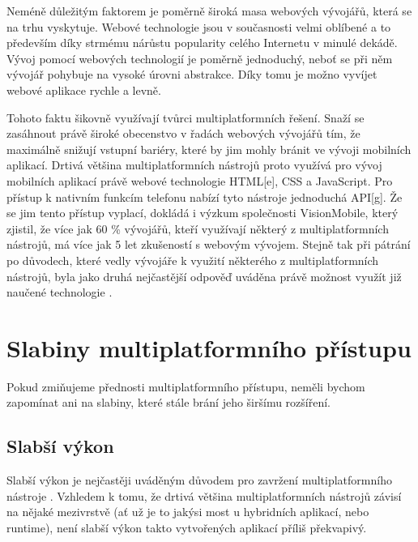 Neméně důležitým faktorem je poměrně široká masa webových vývojářů, která se na trhu vyskytuje. Webové technologie jsou v současnosti velmi oblíbené a to především díky strmému nárůstu popularity celého Internetu v minulé dekádě. Vývoj pomocí webových technologií je poměrně jednoduchý, neboť se při něm vývojář pohybuje na vysoké úrovni abstrakce. Díky tomu je možno vyvíjet webové aplikace rychle a levně.

Tohoto faktu šikovně využívají tvůrci multiplatformních řešení. Snaží se zasáhnout právě široké obecenstvo v řadách webových vývojářů tím, že maximálně snižují vstupní bariéry, které by jim mohly bránit ve vývoji mobilních aplikací. Drtivá většina multiplatformních nástrojů proto využívá pro vývoj mobilních aplikací právě webové technologie HTML[e], CSS a JavaScript. Pro přístup k nativním funkcím telefonu nabízí tyto nástroje jednoduchá API[g]. Že se jim tento přístup vyplací, dokládá i výzkum společnosti VisionMobile, který zjistil, že více jak 60 \% vývojářů, kteří využívají některý z multiplatformních nástrojů, má více jak 5 let zkušeností s webovým vývojem. Stejně tak při pátrání po důvodech, které vedly vývojáře k využití některého z multiplatformních nástrojů, byla jako druhá nejčastější odpověď uváděna právě možnost využít již naučené technologie \cite{visionmobile_survey}.

\section{Slabiny multiplatformního přístupu}
Pokud zmiňujeme přednosti multiplatformního přístupu, neměli bychom zapomínat ani na slabiny, které stále brání jeho širšímu rozšíření.

\subsection{Slabší výkon}
Slabší výkon je nejčastěji uváděným důvodem pro zavržení multiplatformního nástroje \cite{visionmobile_survey}. Vzhledem k tomu, že drtivá většina multiplatformních nástrojů závisí na nějaké mezivrstvě (ať už je to jakýsi most u hybridních aplikací, nebo runtime), není slabší výkon takto vytvořených aplikací příliš překvapivý.


